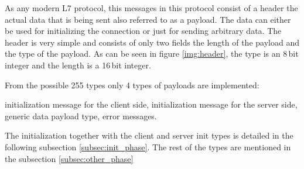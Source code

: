 As any modern L7 protocol, this messages in this protocol consist of a header the actual data that is being sent also referred to as a payload. The data can either be used for initializing the connection or just for sending arbitrary data. The header is very simple and consists of only two fields the length of the payload and the type of the payload. As can be seen in figure \ref{img:header}, the type is an 8\,bit integer and the length is a 16\,bit integer.

\noindent From the possible 255 types only 4 types of payloads are implemented:
\begin{itemize}
  initialization message for the client side,
  initialization message for the server side,
  generic data payload type,
  error messages.
\end{itemize}
The initialization together with the client and server init types is detailed in the following subsection \ref{subsec:init_phase}. The rest of the types are mentioned in the subsection \ref{subsec:other_phase}
